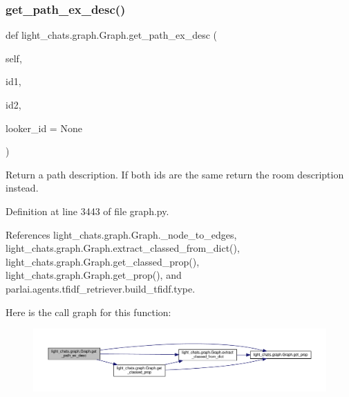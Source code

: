 \subsubsection{\texorpdfstring{get\+\_\+path\+\_\+ex\+\_\+desc()}{get\_path\_ex\_desc()}}
{\footnotesize\ttfamily def light\+\_\+chats.\+graph.\+Graph.\+get\+\_\+path\+\_\+ex\+\_\+desc (\begin{DoxyParamCaption}\item[{}]{self,  }\item[{}]{id1,  }\item[{}]{id2,  }\item[{}]{looker\+\_\+id = {\ttfamily None} }\end{DoxyParamCaption})}

\begin{DoxyVerb}Return a path description. If both ids are the same return the
room description instead.
\end{DoxyVerb}
 

Definition at line 3443 of file graph.\+py.



References light\+\_\+chats.\+graph.\+Graph.\+\_\+node\+\_\+to\+\_\+edges, light\+\_\+chats.\+graph.\+Graph.\+extract\+\_\+classed\+\_\+from\+\_\+dict(), light\+\_\+chats.\+graph.\+Graph.\+get\+\_\+classed\+\_\+prop(), light\+\_\+chats.\+graph.\+Graph.\+get\+\_\+prop(), and parlai.\+agents.\+tfidf\+\_\+retriever.\+build\+\_\+tfidf.\+type.

Here is the call graph for this function\+:
\nopagebreak
\begin{figure}[H]
\begin{center}
\leavevmode
\includegraphics[width=350pt]{classlight__chats_1_1graph_1_1Graph_adf4ddcd30a97e5d02bc23f5c0a09c8bb_cgraph}
\end{center}
\end{figure}
\mbox{\label{classlight__chats_1_1graph_1_1Graph_af857c9968c7787d742ac731d1cd7cb2c}} 
